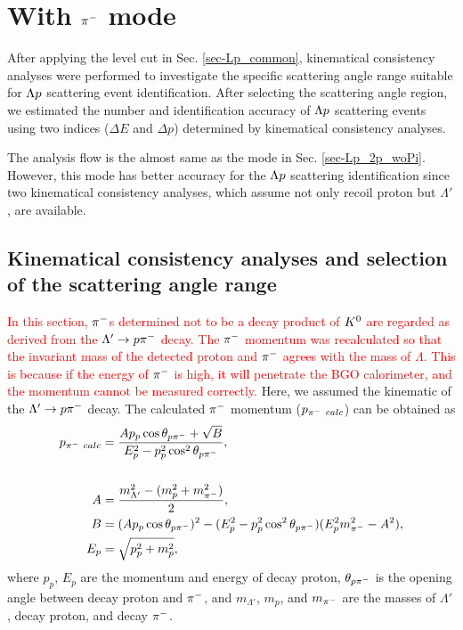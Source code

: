 \clearpage
\section{With $\pi^{-}$ mode}
\label{sec-Lp_2p_wPi}

After applying the  level cut in Sec. \ref{sec-Lp_common}, kinematical consistency analyses were performed to investigate the specific scattering angle range suitable for $\Lambda p$ scattering event identification. %
After selecting the scattering angle region, we estimated the number and identification accuracy of $\Lambda p$ scattering events using two indices ($\Delta E$ and $\Delta p$) determined by kinematical consistency analyses.

The analysis flow is the almost same as the  mode in Sec. \ref{sec-Lp_2p_woPi}. However, this  mode has better accuracy for the $\Lambda p$ scattering identification since two kinematical consistency analyses, which assume not only recoil proton but $\Lambda'$, are available. 



\subsection{Kinematical consistency analyses and selection of the scattering angle range}
\label{sec-2p_w_kine}

\textcolor{red}{ In this section, $\pi^{-}$s determined not to be a decay product of $K^{0}$ are regarded as derived from the $\Lambda'\to p\pi^{-}$ decay. 
The $\pi^{-}$ momentum was recalculated so that the invariant mass of the detected proton and $\pi^{-}$ agrees with the mass of $\Lambda$. This is because if the energy of $\pi^{-}$ is high, it will penetrate the BGO calorimeter, and the momentum cannot be measured correctly.  }
Here, we assumed the kinematic of the $\Lambda'\to p\pi^{-}$ decay. The calculated $\pi^{-}$ momentum ($p_{\pi^{-}\ calc}$) can be obtained as
\begin{align}
  p_{\pi^{-}\ calc} &= \frac{A p_{p} \cos{\theta_{p\pi^{-}}} + \sqrt{B}}{E_{p}^{2} - p_{p}^{2} \cos^{2}{\theta_{p\pi^{-}}}}, \\
  \nonumber \\
  A &= \frac{m_{\Lambda'}^{2} - (m_{p}^{2} + m_{\pi^{-}}^{2})}{2}, \\
  B &= (A p_{p} \cos{\theta_{p\pi^{-}}})^{2} - (E_{p}^{2} - p_{p}^{2} \cos^{2}{\theta_{p\pi^{-}}}) (E_{p}^{2} m_{\pi^{-}}^{2} - A^{2}), \\
  E_{p} &= \sqrt{p_{p}^{2} + m_{p}^{2}},
  \label{eq-pMmomrecal}
\end{align}
where $p_{p}$, $E_{p}$ are the momentum and energy of decay proton, $\theta_{p\pi^{-}}$ is the opening angle between decay proton and $\pi^{-}$, and $m_{\Lambda'}$, $m_{p}$, and $m_{\pi^{-}}$ are the masses of $\Lambda'$, decay proton, and decay $\pi^{-}$.


